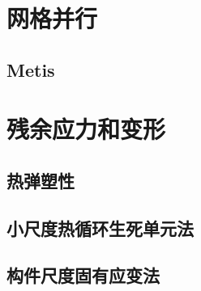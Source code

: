 \chapter{网格并行}

\section{Metis}

\chapter{残余应力和变形}

\section{热弹塑性}

\section{小尺度热循环生死单元法}

\section{构件尺度固有应变法}
